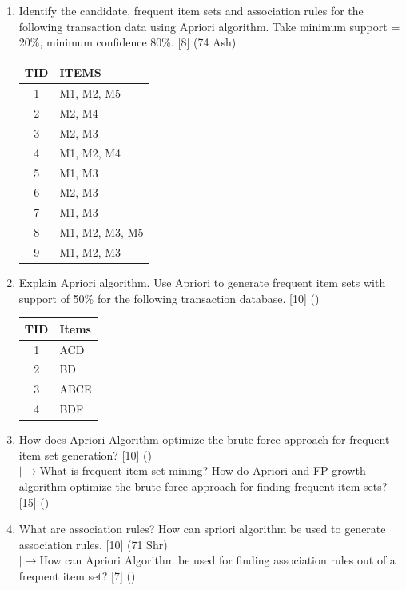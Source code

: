 \documentclass[12pt]{article}
\newcommand{\lb}{\\$\left|\rightarrow\right.$}
\begin{document}
\begin{enumerate}[topsep=0pt, noitemsep]
      \item Identify the candidate, frequent item sets and association rules for the following transaction data using Apriori algorithm. Take minimum support = 20\%, minimum confidence 80\%. \hfill [8] (74 Ash)\\
        \small
        \begin{tabular}{|c|l|}
          \hline
          TID & ITEMS \\ \hline
          1 & M1, M2, M5 \\ \hline
          2 & M2, M4 \\ \hline
          3 & M2, M3 \\ \hline
          4 & M1, M2, M4 \\ \hline
          5 & M1, M3 \\ \hline
          6 & M2, M3 \\ \hline
          7 & M1, M3 \\ \hline
          8 & M1, M2, M3, M5 \\ \hline
          9 & M1, M2, M3 \\ \hline
        \end{tabular}
        \normalsize

      \item Explain Apriori algorithm. Use Apriori to generate frequent item sets with support of 50\% for the following transaction database. \hfill [10] ()\\
        \small
        \begin{tabular}{|c|l|}
          \hline
          TID & Items \\ \hline
          1 & ACD \\ \hline
          2 & BD \\ \hline
          3 & ABCE \\ \hline
          4 & BDF \\ \hline
        \end{tabular}
        \normalsize

      \item How does Apriori Algorithm optimize the brute force approach for frequent item set generation? \hfill [10] ()
        \lb What is frequent item set mining? How do Apriori and FP-growth algorithm optimize the brute force approach for finding frequent item sets? \hfill [15] ()

      \item What are association rules? How can spriori algorithm be used to generate association rules. \hfill [10] (71 Shr)
        \lb How can Apriori Algorithm be used for finding association rules out of a frequent item set? \hfill [7] ()
    \end{enumerate}
\end{document}
